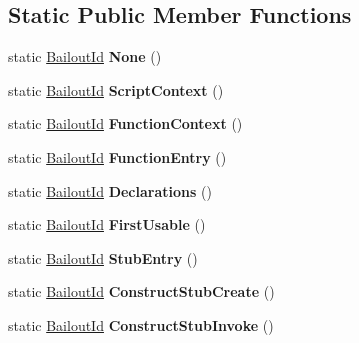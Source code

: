 \subsection*{Static Public Member Functions}
\begin{DoxyCompactItemize}
\item 
\mbox{\label{classv8_1_1internal_1_1BailoutId_ae28ec2edaa82bbe4857e4e56e709ab33}} 
static \mbox{\hyperlink{classv8_1_1internal_1_1BailoutId}{Bailout\+Id}} {\bfseries None} ()
\item 
\mbox{\label{classv8_1_1internal_1_1BailoutId_ae0210bdeb6562467228bcf31f5a5ee99}} 
static \mbox{\hyperlink{classv8_1_1internal_1_1BailoutId}{Bailout\+Id}} {\bfseries Script\+Context} ()
\item 
\mbox{\label{classv8_1_1internal_1_1BailoutId_abedbdfc7ea37468549027b67b3a8ef88}} 
static \mbox{\hyperlink{classv8_1_1internal_1_1BailoutId}{Bailout\+Id}} {\bfseries Function\+Context} ()
\item 
\mbox{\label{classv8_1_1internal_1_1BailoutId_a92ecb683edac7021e0430f3800aab6e1}} 
static \mbox{\hyperlink{classv8_1_1internal_1_1BailoutId}{Bailout\+Id}} {\bfseries Function\+Entry} ()
\item 
\mbox{\label{classv8_1_1internal_1_1BailoutId_a3cf70d09c511d9d723b08f7786b1c897}} 
static \mbox{\hyperlink{classv8_1_1internal_1_1BailoutId}{Bailout\+Id}} {\bfseries Declarations} ()
\item 
\mbox{\label{classv8_1_1internal_1_1BailoutId_a7fe9eca0a53d668361894dadd7a5f29b}} 
static \mbox{\hyperlink{classv8_1_1internal_1_1BailoutId}{Bailout\+Id}} {\bfseries First\+Usable} ()
\item 
\mbox{\label{classv8_1_1internal_1_1BailoutId_a40e64c2d4e63153746fe3f1ae62ebc59}} 
static \mbox{\hyperlink{classv8_1_1internal_1_1BailoutId}{Bailout\+Id}} {\bfseries Stub\+Entry} ()
\item 
\mbox{\label{classv8_1_1internal_1_1BailoutId_a3851eda9e72c53240422473ce360a06a}} 
static \mbox{\hyperlink{classv8_1_1internal_1_1BailoutId}{Bailout\+Id}} {\bfseries Construct\+Stub\+Create} ()
\item 
\mbox{\label{classv8_1_1internal_1_1BailoutId_a7aff28f3ddc1eff40de5ff7b0374cc72}} 
static \mbox{\hyperlink{classv8_1_1internal_1_1BailoutId}{Bailout\+Id}} {\bfseries Construct\+Stub\+Invoke} ()
\end{DoxyCompactItemize}
